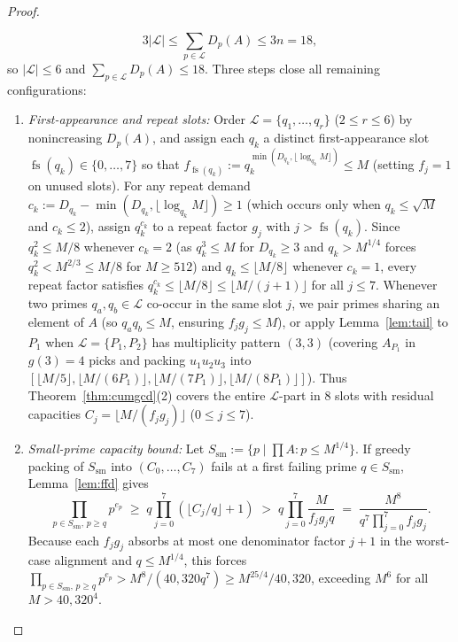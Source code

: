 \documentclass[11pt]{article}
\DeclareMathOperator{\fs}{fs}
\begin{document}
\begin{proof}
\begin{enumerate}
\begin{itemize}
\begin{itemize}
\[
3|\mathcal{L}| \le \sum_{p \in \mathcal{L}} D_p(A) \le 3n = 18,
\]
so $|\mathcal{L}| \le 6$ and $\sum_{p \in \mathcal{L}} D_p(A) \le 18$. Three steps close all remaining configurations:
\begin{enumerate}
\item \emph{First-appearance and repeat slots:} Order $\mathcal{L} = \{q_1, \dots, q_r\}$ ($2 \le r \le 6$) by nonincreasing $D_p(A)$, and assign each $q_k$ a distinct first-appearance slot $\fs(q_k) \in \{0, \dots, 7\}$ so that $f_{\fs(q_k)} := q_k^{\min(D_{q_k}, \lfloor \log_{q_k} M \rfloor)} \le M$ (setting $f_j = 1$ on unused slots). For any repeat demand $c_k := D_{q_k} - \min(D_{q_k}, \lfloor \log_{q_k} M \rfloor) \ge 1$ (which occurs only when $q_k \le \sqrt{M}$ and $c_k \le 2$), assign $q_k^{c_k}$ to a repeat factor $g_j$ with $j > \fs(q_k)$. Since $q_k^2 \le M / 8$ whenever $c_k = 2$ (as $q_k^3 \le M$ for $D_{q_k} \ge 3$ and $q_k > M^{1/4}$ forces $q_k^2 < M^{2/3} \le M / 8$ for $M \ge 512$) and $q_k \le \lfloor M / 8 \rfloor$ whenever $c_k = 1$, every repeat factor satisfies $q_k^{c_k} \le \lfloor M / 8 \rfloor \le \lfloor M / (j + 1) \rfloor$ for all $j \le 7$. Whenever two primes $q_a, q_b \in \mathcal{L}$ co-occur in the same slot $j$, we pair primes sharing an element of $A$ (so $q_a q_b \le M$, ensuring $f_j g_j \le M$), or apply Lemma~\ref{lem:tail} to $P_1$ when $\mathcal{L} = \{P_1, P_2\}$ has multiplicity pattern $(3, 3)$ (covering $A_{P_1}$ in $g(3) = 4$ picks and packing $u_1 u_2 u_3$ into $[\lfloor M / 5 \rfloor, \lfloor M / (6 P_1) \rfloor, \lfloor M / (7 P_1) \rfloor, \lfloor M / (8 P_1) \rfloor]$). Thus Theorem~\ref{thm:cumgcd}(2) covers the entire $\mathcal{L}$-part in $8$ slots with residual capacities $C_j = \lfloor M / (f_j g_j) \rfloor$ ($0 \le j \le 7$).
\item \emph{Small-prime capacity bound:} Let $S_{\mathrm{sm}} := \{p \mid \prod A : p \le M^{1/4}\}$. If greedy packing of $S_{\mathrm{sm}}$ into $(C_0, \dots, C_7)$ fails at a first failing prime $q \in S_{\mathrm{sm}}$, Lemma~\ref{lem:ffd} gives
\[
\prod_{p \in S_{\mathrm{sm}},\, p \ge q} p^{e_p} \;\ge\; q \prod_{j = 0}^7 (\lfloor C_j / q \rfloor + 1) \;>\; q \prod_{j = 0}^7 \frac{M}{f_j g_j q} \;=\; \frac{M^8}{q^7 \prod_{j = 0}^7 f_j g_j}.
\]
Because each $f_j g_j$ absorbs at most one denominator factor $j + 1$ in the worst-case alignment and $q \le M^{1/4}$, this forces $\prod_{p \in S_{\mathrm{sm}},\, p \ge q} p^{e_p} > M^8 / (40{,}320 q^7) \ge M^{25/4} / 40{,}320$, exceeding $M^6$ for all $M > 40{,}320^4$.

\end{enumerate}
\end{itemize}
\end{itemize}
\end{enumerate}
\end{proof}
\end{document}
